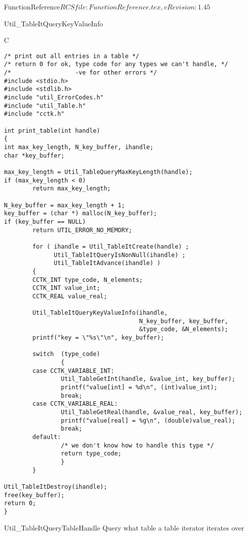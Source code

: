 \begin{cactuspart}{5}{FunctionReference}{$RCSfile: FunctionReference.tex,v $}{$Revision: 1.45 $}
\begin{FunctionDescription}{Util\_TableItQueryKeyValueInfo}
\begin{Example}{C}
\begin{verbatim}
/* print out all entries in a table */
/* return 0 for ok, type code for any types we can't handle, */
/*                  -ve for other errors */
#include <stdio.h>
#include <stdlib.h>
#include "util_ErrorCodes.h"
#include "util_Table.h"
#include "cctk.h"

int print_table(int handle)
{
int max_key_length, N_key_buffer, ihandle;
char *key_buffer;

max_key_length = Util_TableQueryMaxKeyLength(handle);
if (max_key_length < 0)
        return max_key_length;

N_key_buffer = max_key_length + 1;
key_buffer = (char *) malloc(N_key_buffer);
if (key_buffer == NULL)
        return UTIL_ERROR_NO_MEMORY;

        for ( ihandle = Util_TableItCreate(handle) ;
              Util_TableItQueryIsNonNull(ihandle) ;
              Util_TableItAdvance(ihandle) )
        {
        CCTK_INT type_code, N_elements;
        CCTK_INT value_int;
        CCTK_REAL value_real;

        Util_TableItQueryKeyValueInfo(ihandle,
                                      N_key_buffer, key_buffer,
                                      &type_code, &N_elements);
        printf("key = \"%s\"\n", key_buffer);

        switch  (type_code)
                {
        case CCTK_VARIABLE_INT:
                Util_TableGetInt(handle, &value_int, key_buffer);
                printf("value[int] = %d\n", (int)value_int);
                break;
        case CCTK_VARIABLE_REAL:
                Util_TableGetReal(handle, &value_real, key_buffer);
                printf("value[real] = %g\n", (double)value_real);
                break;
        default:
                /* we don't know how to handle this type */
                return type_code;
                }
        }

Util_TableItDestroy(ihandle);
free(key_buffer);
return 0;
}
\end{verbatim}
\end{Example}
\end{FunctionDescription}


\begin{FunctionDescription}{Util\_TableItQueryTableHandle}
\label{Util-TableItQueryTableHandle}
Query what table a table iterator iterates over


\end{FunctionDescription}
\end{cactuspart}
